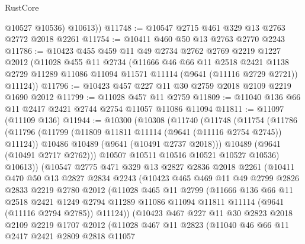 \begin{lexlean}{RustCore}
\begin{coremodule}
          @10527
          @10536)
        @10613))
@11748 := @10547 @2715 @461 @329 @13 @2763 @2772 @2018 @2261
@11754 := @10411 @460 @50 @13 @2763 @2770 @2243
@11786 := @10423
    @455
    @459
    @11
    @49
    @2734
    @2762
    @2769
    @2219
    @1227
    @2012
    (@11028
      @455
      @11
      @2734
      (@11666
        @46
        @66
        @11
        @2518
        @2421
        @1138
        @2729
        @11289
        @11086
        @11094
        @11571
        @11114
        (@9641 (@11116 @2729 @2721))
        @11124))
@11796 := @10423 @457 @227 @11 @30 @2759 @2018 @2109 @2219 @1690 @2012
@11799 := @11028 @457 @11 @2759
@11809 := @11040 @136 @66 @11 @2417 @2421 @2744 @2754 @11057 @11086 @11094
@11811 := @11097 (@11109 @136)
@11944 := @10300
    (@10308
      (@11740
        (@11748
          (@11754
            (@11786
              (@11796
                (@11799 (@11809 @11811 @11114 (@9641 (@11116 @2754 @2745)) @11124))
                @10486
                @10489
                (@9641 (@10491 @2737 @2018)))
              @10489
              (@9641 (@10491 @2717 @2762)))
            @10507
            @10511
            @10516
            @10521
            @10527
            @10536)
          @10613))
      (@10547
        @2775
        @471
        @329
        @13
        @2827
        @2836
        @2018
        @2261
        (@10411
          @470
          @50
          @13
          @2827
          @2834
          @2243
          (@10423
            @465
            @469
            @11
            @49
            @2799
            @2826
            @2833
            @2219
            @2780
            @2012
            (@11028
              @465
              @11
              @2799
              (@11666
                @136
                @66
                @11
                @2518
                @2421
                @1249
                @2794
                @11289
                @11086
                @11094
                @11811
                @11114
                (@9641 (@11116 @2794 @2785))
                @11124))
            (@10423
              @467
              @227
              @11
              @30
              @2823
              @2018
              @2109
              @2219
              @1707
              @2012
              (@11028
                @467
                @11
                @2823
                (@11040
                  @46
                  @66
                  @11
                  @2417
                  @2421
                  @2809
                  @2818
                  @11057

\end{coremodule}
\end{lexlean}
